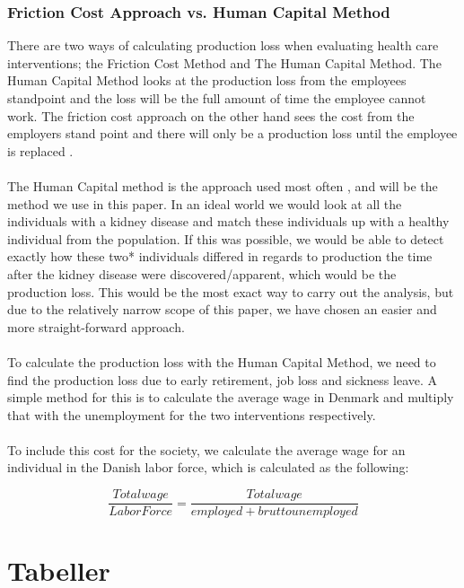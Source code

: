 \documentclass[a4paper,12pt]{article}
\begin{document}
\subsubsection*{Friction Cost Approach vs.  Human Capital Method }
There are two ways of calculating production loss when evaluating health care interventions; the Friction Cost Method and The Human Capital Method. The Human Capital Method looks at the production loss from the employees standpoint and the loss will be the full amount of time the employee cannot work. The friction cost approach on the other hand sees the cost from the employers stand point and there will only be a production loss until the employee is replaced \cite{friktion}. 
\\\\
The Human Capital method is the approach used most often \cite{friktion}, and will be the method we use in this paper. In an ideal world we would look at all the individuals with a kidney disease and match these individuals up with a healthy individual from the population. If this was possible, we would be able to detect exactly how these two* individuals differed in regards to production the time after the kidney disease were discovered/apparent, which would be the production loss. This would be the most exact way to carry out the analysis, but due to the relatively narrow scope of this paper, we have chosen an easier and more straight-forward approach. 
\\\\
To calculate the production loss with the Human Capital Method, we need to find the production loss due to early retirement, job loss and sickness leave. A simple method for this is to calculate the average wage in Denmark and multiply that with the unemployment for the two interventions respectively.
\\\\
To include this cost for the society, we calculate the average wage for an individual in the Danish labor force, which is calculated as the following: 

\begin{equation}
\dfrac{Total wage}{Labor Force} = \dfrac{Total wage}{employed + brutto unemployed} 
\end{equation}





\section{Tabeller}
\end{document}
